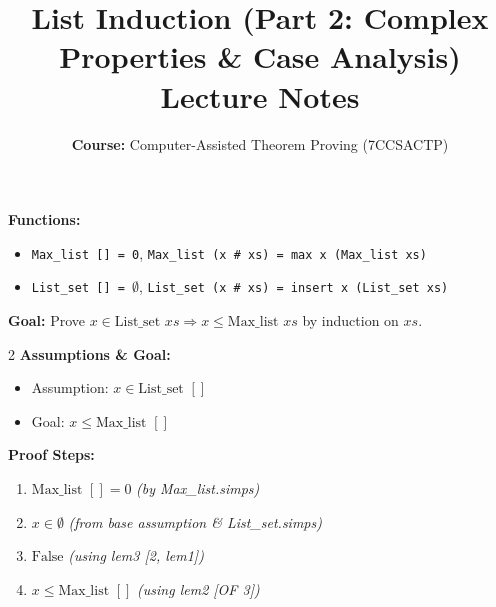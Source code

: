 \documentclass[10pt,a4paper]{article}
\title{\textbf{\huge List Induction (Part 2: Complex Properties \& Case Analysis)}\\[0.3em]
\large Lecture Notes}
\author{\textbf{Course:} Computer-Assisted Theorem Proving (7CCSACTP)}
\date{}
\begin{document}
\maketitle
\vspace{-1.5em}

\begin{tcolorbox}[title={Definitions \& Goal Statement}]
\textbf{Functions:}
\begin{itemize}[leftmargin=1.2em, itemsep=2pt]
    \item \texttt{Max\_list [] = 0}, \quad \texttt{Max\_list (x \# xs) = max x (Max\_list xs)}
    \item \texttt{List\_set [] = $\emptyset$}, \quad \texttt{List\_set (x \# xs) = insert x (List\_set xs)}
\end{itemize}
\textbf{Goal:} Prove $x \in \text{List\_set } xs \Longrightarrow x \le \text{Max\_list } xs$ by induction on $xs$.
\end{tcolorbox}

\vspace{0.3em}

\begin{tcolorbox}[title={Base Case ($xs = []$)}]
\begin{multicols}{2}
\textbf{Assumptions \& Goal:}
\begin{itemize}[leftmargin=1.2em, itemsep=2pt]
    \item Assumption: $x \in \text{List\_set } []$
    \item Goal: $x \le \text{Max\_list } []$
\end{itemize}

\columnbreak

\textbf{Proof Steps:}
\begin{enumerate}[leftmargin=1.2em, itemsep=2pt]
    \item $\text{Max\_list } [] = 0$ \quad \textit{(by Max\_list.simps)}
    \item $x \in \emptyset$ \quad \textit{(from base assumption \& List\_set.simps)}
    \item $\text{False}$ \quad \textit{(using lem3 [2, lem1])}
    \item $x \le \text{Max\_list } []$ \quad \textit{(using lem2 [OF 3])}
\end{enumerate}
\end{multicols}
\end{tcolorbox}

\vspace{0.3em}
\end{document}
